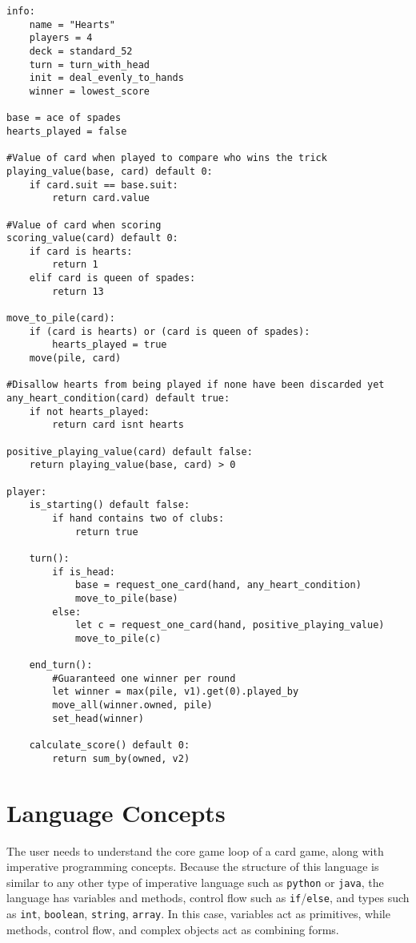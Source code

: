 \documentclass{article}
\begin{document}
\begin{lstlisting}
info:
    name = "Hearts"
    players = 4
    deck = standard_52
    turn = turn_with_head
    init = deal_evenly_to_hands
    winner = lowest_score

base = ace of spades
hearts_played = false

#Value of card when played to compare who wins the trick
playing_value(base, card) default 0:
    if card.suit == base.suit:
        return card.value

#Value of card when scoring
scoring_value(card) default 0:
    if card is hearts:
        return 1
    elif card is queen of spades:
        return 13

move_to_pile(card):
    if (card is hearts) or (card is queen of spades):
        hearts_played = true
    move(pile, card)

#Disallow hearts from being played if none have been discarded yet
any_heart_condition(card) default true:
    if not hearts_played:
        return card isnt hearts
        
positive_playing_value(card) default false:
    return playing_value(base, card) > 0

player:
    is_starting() default false:
        if hand contains two of clubs:
            return true

    turn():
        if is_head:
            base = request_one_card(hand, any_heart_condition)
            move_to_pile(base)
        else:
            let c = request_one_card(hand, positive_playing_value) 
            move_to_pile(c)

    end_turn():
        #Guaranteed one winner per round
        let winner = max(pile, v1).get(0).played_by
        move_all(winner.owned, pile)
        set_head(winner)

    calculate_score() default 0:
        return sum_by(owned, v2)
\end{lstlisting}


\section{Language Concepts}
The user needs to understand the core game loop of a card game, along with imperative programming concepts. Because the structure of this language is similar to any other type of imperative language such as \texttt{python} or \texttt{java}, the language has variables and methods, control flow such as \texttt{if}/\texttt{else}, and types such as \texttt{int}, \texttt{boolean}, \texttt{string}, \texttt{array}. In this case, variables act as primitives, while methods, control flow, and complex objects act as combining forms.
\end{document}
